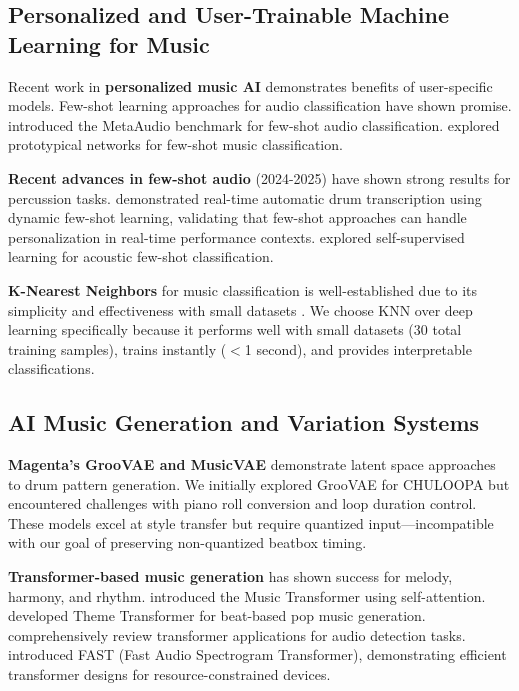 \documentclass{aimc2026}
\begin{document}
\subsection{Personalized and User-Trainable Machine Learning for Music}

Recent work in \textbf{personalized music AI} demonstrates benefits of user-specific models. Few-shot learning approaches for audio classification have shown promise. \citet{wang2020metaaudio} introduced the MetaAudio benchmark for few-shot audio classification. \citet{pons2019prototypical} explored prototypical networks for few-shot music classification.

\textbf{Recent advances in few-shot audio} (2024-2025) have shown strong results for percussion tasks. \citet{weber2024realtime} demonstrated real-time automatic drum transcription using dynamic few-shot learning, validating that few-shot approaches can handle personalization in real-time performance contexts. \citet{smith2025selfsupervised} explored self-supervised learning for acoustic few-shot classification.

\textbf{K-Nearest Neighbors} for music classification is well-established due to its simplicity and effectiveness with small datasets \citep{flexer2007distance,pampalk2005computational}. We choose KNN over deep learning specifically because it performs well with small datasets (30 total training samples), trains instantly ($<$1 second), and provides interpretable classifications.

\subsection{AI Music Generation and Variation Systems}

\textbf{Magenta's GrooVAE and MusicVAE} \citep{gillick2019learning} demonstrate latent space approaches to drum pattern generation. We initially explored GrooVAE for CHULOOPA but encountered challenges with piano roll conversion and loop duration control. These models excel at style transfer but require quantized input---incompatible with our goal of preserving non-quantized beatbox timing.

\textbf{Transformer-based music generation} has shown success for melody, harmony, and rhythm. \citet{huang2018music} introduced the Music Transformer using self-attention. \citet{shih2023theme} developed Theme Transformer for beat-based pop music generation. \citet{zaman2025transformers} comprehensively review transformer applications for audio detection tasks. \citet{naman2025fast} introduced FAST (Fast Audio Spectrogram Transformer), demonstrating efficient transformer designs for resource-constrained devices.
\end{document}
